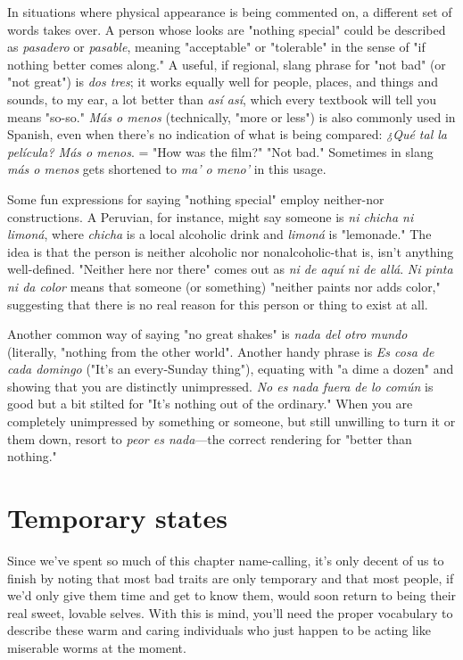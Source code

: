 \documentclass[14pt,a4paper,oneside]{memoir}
\begin{document}
In situations where physical appearance is being commented
on, a different set of words takes over. A person whose looks are "nothing special" could be described as \emph{pasadero} or \emph{pasable}, meaning "acceptable" or "tolerable" in the sense of "if nothing better comes
along." A useful, if regional, slang phrase for "not bad" (or "not great")
is \emph{dos tres}; it works equally well for people, places, and things and
sounds, to my ear, a lot better than \emph{así así}, which every textbook will
tell you means "so-so." \emph{Más o menos} (technically, "more or less") is
also commonly used in Spanish, even when there's no indication of
what is being compared: \emph{¿Qué tal la película? Más o menos}. = "How
was the film?" "Not bad." Sometimes in slang \emph{más o menos} gets
shortened to \emph{ma' o meno'} in this usage.

Some fun expressions for saying "nothing special" employ neither-nor constructions. A Peruvian, for instance, might say someone is
\emph{ni chicha ni limoná}, where \emph{chicha} is a local alcoholic drink and \emph{limoná} is "lemonade." The idea is that the person is neither alcoholic
nor nonalcoholic-that is, isn't anything well-defined. "Neither here
nor there" comes out as \emph{ni de aquí ni de allá}. \emph{Ni pinta ni da color}
means that someone (or something) "neither paints nor adds color,"
suggesting that there is no real reason for this person or thing to exist
at all.

Another common way of saying "no great shakes" is \emph{nada del
otro mundo} (literally, "nothing from the other world". Another handy
phrase is \emph{Es cosa de cada domingo} ("It's an every-Sunday thing"),
equating with "a dime a dozen" and showing that you are distinctly
unimpressed. \emph{No es nada fuera de lo común} is good but a bit stilted
for "It's nothing out of the ordinary." When you are completely unimpressed by something or someone, but still unwilling to turn it or
them down, resort to \emph{peor es nada}---the correct rendering for "better
than nothing."

\section{Temporary states}

Since we've spent so much of this chapter name-calling, it's
only decent of us to finish by noting that most bad traits are only
temporary and that most people, if we'd only give them time and get
to know them, would soon return to being their real sweet, lovable
selves. With this is mind, you'll need the proper vocabulary to describe
these warm and caring individuals who just happen to be acting like
miserable worms at the moment.
\end{document}
